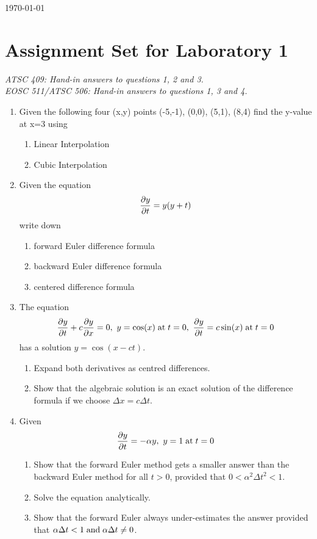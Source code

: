 \documentclass[12pt]{article}
\begin{document}
\begin{flushright}
\today
\end{flushright}

\section*{Assignment Set for Laboratory 1}
{\it ATSC 409: Hand-in answers to questions 1, 2 and 3.\\
EOSC 511/ATSC 506: Hand-in answers to questions 1, 3 and 4.}


\begin{enumerate}
\item Given the following four (x,y) points  (-5,-1), (0,0), (5,1), (8,4) find the y-value at x=3 using
\begin{enumerate}
\item Linear Interpolation
\item Cubic Interpolation
\end{enumerate}
\item Given the equation
\begin{equation}
\frac {\partial y}{\partial t} = y(y+t)
\end{equation}
write down
\begin{enumerate}
\item forward Euler difference formula
\item backward Euler difference formula
\item centered difference formula
\end{enumerate}
\item The equation
\begin{equation}
\frac {\partial y}{\partial t} + c \frac {\partial y}{\partial x} = 0,\ y = \cos(x) \;{\rm at}\; t=0,\ \frac {\partial y}{\partial t} = c \sin(x) \;{\rm at}\; t=0
\end{equation}
has a solution $y=\cos(x-ct)$.
\begin{enumerate}
\item Expand both derivatives as centred differences.
\item Show that the algebraic solution is an exact solution of the difference formula if we choose $\Delta x = c \Delta t$.
\end{enumerate}
\item Given
\begin{equation}
\frac {\partial y}{\partial t} = -\alpha y,\ y = 1 \;{\rm at}\; t=0
\end{equation}
\begin{enumerate}
\item Show that the forward Euler method gets a smaller answer than the backward Euler method for all $t > 0$, provided that $0 < \alpha^2 \Delta t^2 < 1$.
\item Solve the equation analytically.
\item Show that the forward Euler always under-estimates the answer provided that $\alpha \Delta t < 1 \;{\rm and}\; \alpha \Delta t \ne 0$.
\end{enumerate}\end{enumerate}
\end{document}
